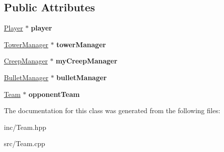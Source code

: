 \subsection*{Public Attributes}
\begin{DoxyCompactItemize}
\item 
\hypertarget{class_team_a89e6713494c0fd89044482229f8c72f9}{\hyperlink{class_player}{Player} $\ast$ {\bfseries player}}\label{class_team_a89e6713494c0fd89044482229f8c72f9}

\item 
\hypertarget{class_team_ad298136aa0ced310f729ff755a6bf3b6}{\hyperlink{class_tower_manager}{Tower\+Manager} $\ast$ {\bfseries tower\+Manager}}\label{class_team_ad298136aa0ced310f729ff755a6bf3b6}

\item 
\hypertarget{class_team_aa3a468917b4edc4a78a6f8fae6469e74}{\hyperlink{class_creep_manager}{Creep\+Manager} $\ast$ {\bfseries my\+Creep\+Manager}}\label{class_team_aa3a468917b4edc4a78a6f8fae6469e74}

\item 
\hypertarget{class_team_a478e13f835f895a375057456ea392510}{\hyperlink{class_bullet_manager}{Bullet\+Manager} $\ast$ {\bfseries bullet\+Manager}}\label{class_team_a478e13f835f895a375057456ea392510}

\item 
\hypertarget{class_team_adac58866fdfd952f12abc6d4b47638d6}{\hyperlink{class_team}{Team} $\ast$ {\bfseries opponent\+Team}}\label{class_team_adac58866fdfd952f12abc6d4b47638d6}

\end{DoxyCompactItemize}


The documentation for this class was generated from the following files\+:\begin{DoxyCompactItemize}
\item 
inc/Team.\+hpp\item 
src/Team.\+cpp\end{DoxyCompactItemize}
